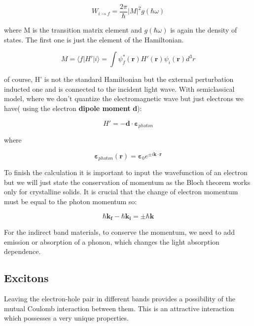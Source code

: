 \begin{equation}
W_{i\rightarrow f} = \frac{2\pi}{\hbar}|M|^2g(\hbar \omega)
\end{equation}

where M is the transition matrix element and $g(\hbar \omega)$ is again the density of states. The first one is just the element of the Hamiltonian. 

\begin{equation}
M = \langle f|H'| i \rangle = \int \psi_f^* (\mathbf{r})H'(\mathbf{r})\psi_i(\mathbf{r}) d^3r
\end{equation}

of course, H' is not the standard Hamiltonian but the external perturbation inducted one and is connected to the incident light wave. With semiclassical model, where we don't quantize the electromagnetic wave but just electrons we have( using the electron \textbf{dipole moment} \textbf{d}):

\begin{equation}
H' =- \mathbf{d} \cdot \mathbf{\varepsilon} _{photon}
\end{equation}

where

\begin{equation}
\mathbf{\varepsilon} _{photon} (\mathbf{r}) = \mathbf{\varepsilon} _0 e^{\pm i \mathbf{k \cdot r}}
\end{equation}

To finish the calculation it is important to input the wavefunction of an electron but we will just state  the conservation of momentum as the Bloch theorem works only for crystalline solids. It is crucial that the change of electron momentum must be equal to the photon momentum so:

\begin{equation}
\hbar \mathbf{k_f} - \hbar \mathbf{k_i} = \pm \hbar \mathbf{k}
\end{equation}

For the indirect band materials, to conserve the momentum, we need to add emission or absorption of a phonon,  which changes the light absorption dependence. 

\subsection{Excitons}
Leaving the electron-hole pair in different bands provides a possibility of the mutual Coulomb interaction between them. This is an attractive interaction which possesses a very unique properties. 

